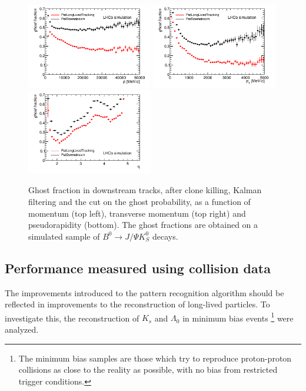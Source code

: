 \begin{figure}[tbph]
\begin{center}
\includegraphics[width = 0.49\textwidth]{figures/EffPatLLT/compare/BJpsiKSGhostFracP_TBTC.png} 
\includegraphics[width = 0.49\textwidth]{figures/EffPatLLT/compare/BJpsiKSGhostFracPt_TBTC.png}
\includegraphics[width = 0.49\textwidth]{figures/EffPatLLT/compare/BJpsiKSGhostFracEta_TBTC.png} 
\caption{Ghost fraction in downstream tracks, after clone killing, Kalman filtering and the cut on the ghost probability, as a function of momentum (top left), transverse momentum (top right) and pseudorapidity (bottom). The ghost fractions are obtained on a simulated sample of  $B^{0} \rightarrow J/\Psi K^{0}_{S}$ decays.}
\label{fig:ghostCompPatLLTBJpsiK_TBTC}
 \end{center}
 \end{figure}

\subsection{Performance measured using collision data}
\label{sec:performance_data}
The improvements introduced to the pattern recognition algorithm should be reflected in improvements to the reconstruction of long-lived particles. To investigate this, the reconstruction of $K_s$ and $\Lambda_0$ in minimum bias events \footnote{The minimum bias samples are those which try to reproduce proton-proton collisions as close to the reality as possible, with no bias from restricted trigger conditions.} were analyzed. 

